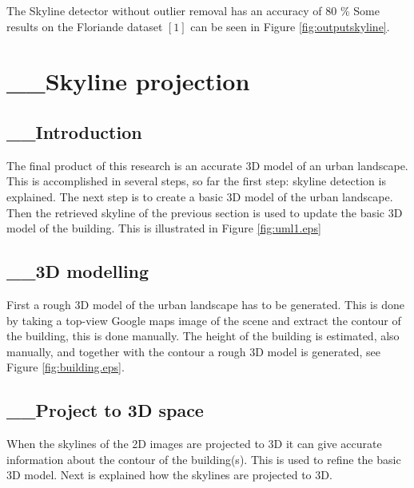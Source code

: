 \documentclass[10pt]{article}
\begin{document}
The Skyline detector without outlier removal has an accuracy of 80 \% 
Some results on the Floriande dataset $[1]$ can be seen in Figure \ref{fig:outputskyline}.



\section{__Skyline projection}
 \subsection{__Introduction}
The final product of this research is an accurate 3D model of an urban
landscape. This is accomplished in several steps, so far the first step: skyline detection is
explained. The next step is to create a basic 3D model of the urban landscape.
Then the retrieved skyline of the previous section is used to update the basic
3D model of the building. This is illustrated in Figure \ref{fig:uml1.eps}




   \subsection{__3D modelling}
First a rough 3D model of the urban landscape has to be generated. This is done
by taking a top-view Google maps image of the scene and extract the contour of
the building, this is done manually. 
The height of the building is estimated, also manually, and together with the
contour a rough 3D model is generated, see Figure \ref{fig:building.eps}. 


\subsection{__Project to 3D space}
When the skylines of the 2D images are projected to 3D it can give 
accurate information about the contour of the building(s). This is used to
refine the basic 3D model.  Next is explained how the skylines are projected to
3D.\\
\end{document}

